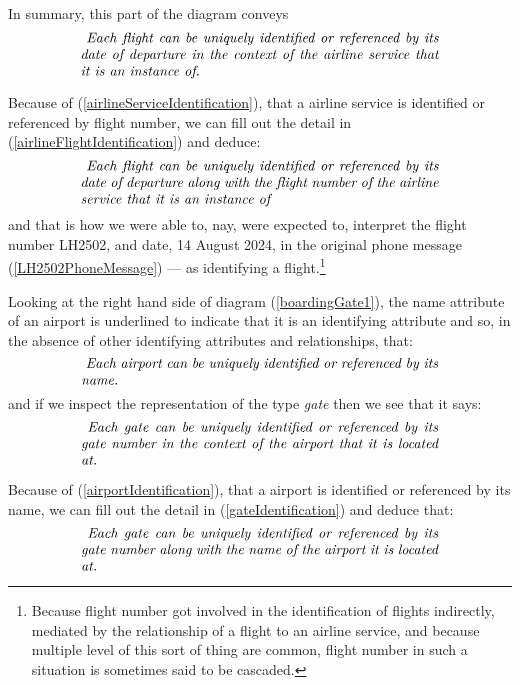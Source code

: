 In summary, this part of the diagram conveys 
\begin{equation}
\label{airlineFlightIdentification}
\text{\parbox{9cm}{\textit{
Each flight can be uniquely identified or referenced by its date of departure in the context of the airline service that it is an instance of.}}}
\end{equation}

\mynote
Because of (\ref{airlineServiceIdentification}), that a airline service is identified or referenced by flight number,  we can fill out the detail in (\ref{airlineFlightIdentification}) and deduce:
\begin{equation}
\label{airlineFlightNetIdentification}
\text{\parbox{9cm}{\textit{
Each flight can be uniquely identified or referenced by its date of departure along with the flight number of the airline service that it is an instance of}}}
\end{equation}
and that is how we were able to, nay, were expected to, interpret the flight number LH2502, 
and date, 14 August 2024, in the original phone message (\ref{LH2502PhoneMessage}) --- as identifying a flight.\footnote{Because flight number got involved in the identification of flights indirectly, 
 mediated by the  relationship of a flight to an airline service, 
 and because multiple level of this sort of thing are common, flight number in such a situation is sometimes said to be cascaded.}

\mynote
Looking at the right hand side of diagram (\ref{boardingGate1}),
the name attribute of an airport is underlined to indicate that
it is an identifying attribute and so, in the absence of other identifying attributes and relationships,
that:
\begin{equation}
\label{airportIdentification}
\text{\parbox{9cm}{\textit{
Each airport can be uniquely identified or referenced by its name.}}}
\end{equation}
and if we inspect the representation of the type \textit{gate} then we see that it says:
\begin{equation}
\label{gateIdentification}
\text{\parbox{9cm}{\textit{
Each gate can be uniquely identified or referenced by its gate number in the context of the airport that it is located at.}}}
\end{equation}

\mynote
Because of (\ref{airportIdentification}), that a airport is identified or referenced by its name,  we can fill out the detail in (\ref{gateIdentification}) and deduce that:
\begin{equation}
\label{gateNetIdentification}
\text{\parbox{9cm}{\textit{
Each gate can be uniquely identified or referenced by its gate number along with the name of the airport it is located at.}}}
\end{equation}

